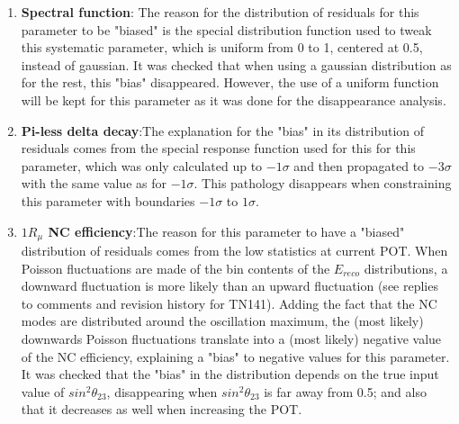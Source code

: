 \begin{enumerate}
\item{{\bf Spectral function}: The reason for the distribution of residuals for this parameter to be "biased" is the special distribution function used to tweak this systematic parameter, which is uniform from 0 to 1, centered at 0.5, instead of gaussian.		
It was checked that when using a gaussian distribution as for the rest, this "bias" disappeared. However, the use of a uniform function will be kept for this parameter as it was done for the disappearance analysis.
}
\item{{\bf Pi-less delta decay}:The explanation for the "bias" in its distribution of residuals comes from the special response function used for this for this parameter, 
which was only calculated up to $-1\sigma$ and then propagated to $-3\sigma$ with the same value as for $-1\sigma$.
This pathology disappears when constraining this parameter with boundaries $-1\sigma$ to $1\sigma$. 
}
\item{{\bf $1R_{\mu}$ NC efficiency}:The reason for this parameter to have a "biased" distribution of residuals comes from the low statistics at current POT.
When Poisson fluctuations are made of the bin contents of the $E_{reco}$ distributions, a downward fluctuation is more likely than an upward fluctuation (see replies to comments and revision history for TN141).
Adding the fact that the NC modes are distributed around the oscillation maximum, the (most likely) downwards Poisson fluctuations translate into a (most likely) negative value of the NC efficiency, explaining a "bias" to negative values for this parameter.
It was checked that the "bias" in the distribution depends on the true input value of $sin^{2}\theta_{23}$, disappearing when $sin^{2}\theta_{23}$ is far away from 0.5; and also that it decreases as well when increasing the POT. 
}
\end{enumerate}


